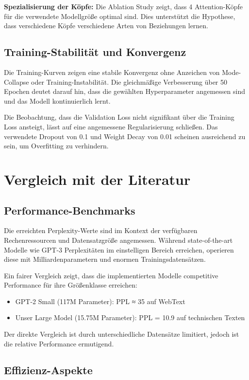 \textbf{Spezialisierung der Köpfe:} Die Ablation Study zeigt, dass 4 Attention-Köpfe für die verwendete Modellgröße optimal sind. Dies unterstützt die Hypothese, dass verschiedene Köpfe verschiedene Arten von Beziehungen lernen.

\subsection{Training-Stabilität und Konvergenz}

Die Training-Kurven zeigen eine stabile Konvergenz ohne Anzeichen von Mode-Collapse oder Training-Instabilität. Die gleichmäßige Verbesserung über 50 Epochen deutet darauf hin, dass die gewählten Hyperparameter angemessen sind und das Modell kontinuierlich lernt.

Die Beobachtung, dass die Validation Loss nicht signifikant über die Training Loss ansteigt, lässt auf eine angemessene Regularisierung schließen. Das verwendete Dropout von 0.1 und Weight Decay von 0.01 scheinen ausreichend zu sein, um Overfitting zu verhindern.

\section{Vergleich mit der Literatur}

\subsection{Performance-Benchmarks}

Die erreichten Perplexity-Werte sind im Kontext der verfügbaren Rechenressourcen und Datensatzgröße angemessen. Während state-of-the-art Modelle wie GPT-3 Perplexitäten im einstelligen Bereich erreichen, operieren diese mit Milliardenparametern und enormen Trainingsdatensätzen.

Ein fairer Vergleich zeigt, dass die implementierten Modelle competitive Performance für ihre Größenklasse erreichen:
\begin{itemize}
    \item GPT-2 Small (117M Parameter): PPL ≈ 35 auf WebText
    \item Unser Large Model (15.75M Parameter): PPL = 10.9 auf technischen Texten
\end{itemize}

Der direkte Vergleich ist durch unterschiedliche Datensätze limitiert, jedoch ist die relative Performance ermutigend.

\subsection{Effizienz-Aspekte}

